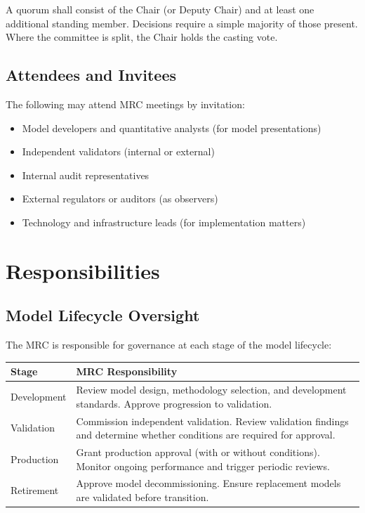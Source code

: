 \documentclass[11pt]{article}
\begin{document}
A quorum shall consist of the Chair (or Deputy Chair) and at least one
additional standing member. Decisions require a simple majority of those
present. Where the committee is split, the Chair holds the casting vote.

\subsection{Attendees and Invitees}

The following may attend MRC meetings by invitation:

\begin{itemize}
    \item Model developers and quantitative analysts (for model presentations)
    \item Independent validators (internal or external)
    \item Internal audit representatives
    \item External regulators or auditors (as observers)
    \item Technology and infrastructure leads (for implementation matters)
\end{itemize}

\section{Responsibilities}

\subsection{Model Lifecycle Oversight}

The MRC is responsible for governance at each stage of the model lifecycle:

\begin{longtable}{p{3.5cm}p{10cm}}
\toprule
\textbf{Stage} & \textbf{MRC Responsibility} \\
\midrule
\endhead
Development & Review model design, methodology selection, and development
              standards. Approve progression to validation. \\[6pt]
Validation & Commission independent validation. Review validation findings
             and determine whether conditions are required for approval. \\[6pt]
Production & Grant production approval (with or without conditions). Monitor
             ongoing performance and trigger periodic reviews. \\[6pt]
Retirement & Approve model decommissioning. Ensure replacement models are
             validated before transition. \\
\bottomrule
\end{longtable}
\end{document}
